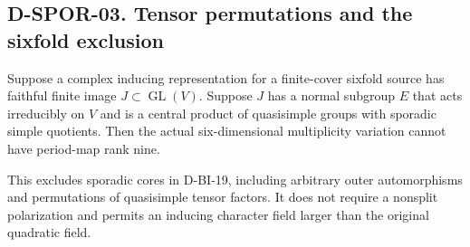 \subsection*{D-SPOR-03. Tensor permutations and the sixfold exclusion}

\begin{theorem}\label{D-SPOR-03}
Suppose a complex inducing representation for a finite-cover
sixfold source has faithful finite image $J\subset\operatorname{GL}(V)$.
Suppose $J$ has a normal subgroup $E$ that acts irreducibly on $V$
and is a central product of quasisimple groups with sporadic simple
quotients.  Then the actual six-dimensional multiplicity variation
cannot have period-map rank nine.

This excludes sporadic cores in D-BI-19, including arbitrary outer
automorphisms and permutations of quasisimple tensor factors.  It
does not require a nonsplit polarization and permits an inducing
character field larger than the original quadratic field.
\end{theorem}

